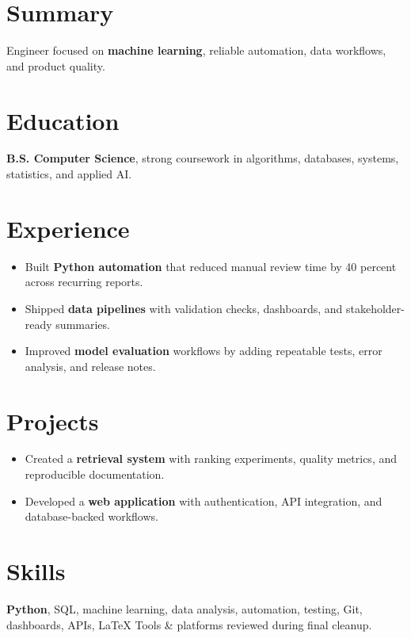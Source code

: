 \documentclass[10pt]{article}
\begin{document}
\section*{Summary}
Engineer focused on \textbf{machine learning}, reliable automation, data workflows, and product quality.
\section*{Education}
\textbf{B.S. Computer Science}, strong coursework in algorithms, databases, systems, statistics, and applied AI.
\section*{Experience}
\begin{itemize}\item Built \textbf{Python automation} that reduced manual review time by 40 percent across recurring reports.\item Shipped \textbf{data pipelines} with validation checks, dashboards, and stakeholder-ready summaries.\item Improved \textbf{model evaluation} workflows by adding repeatable tests, error analysis, and release notes.\end{itemize}
\section*{Projects}
\begin{itemize}\item Created a \textbf{retrieval system} with ranking experiments, quality metrics, and reproducible documentation.\item Developed a \textbf{web application} with authentication, API integration, and database-backed workflows.\end{itemize}
\section*{Skills}
\textbf{Python}, SQL, machine learning, data analysis, automation, testing, Git, dashboards, APIs, LaTeX
Tools & platforms reviewed during final cleanup.
\end{document}
